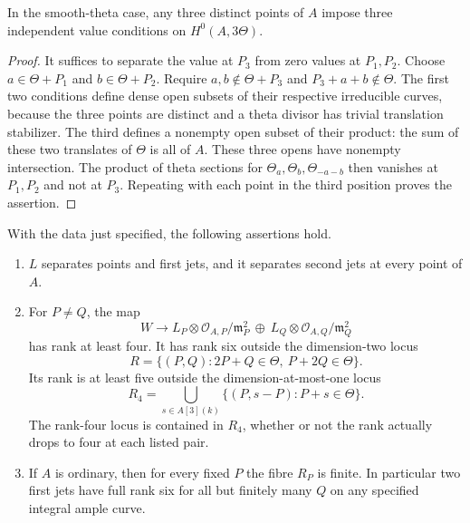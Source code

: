 \begin{lemma}\label{lem:ppav-three-distinct-values}
In the smooth-theta case, any three distinct points of $A$ impose three
independent value conditions on $H^0(A,3\Theta)$.
\end{lemma}
\begin{proof}
It suffices to separate the value at $P_3$ from zero values at
$P_1,P_2$. Choose $a\in\Theta+P_1$ and $b\in\Theta+P_2$.
Require $a,b\notin\Theta+P_3$ and $P_3+a+b\notin\Theta$.
The first two conditions define dense open subsets of their respective
irreducible curves, because the three points are distinct and a theta
divisor has trivial translation stabilizer. The third defines a
nonempty open subset of their product: the sum of these two translates
of $\Theta$ is all of $A$. These three opens have nonempty intersection.
The product of theta sections for $\Theta_a,\Theta_b,\Theta_{-a-b}$
then vanishes at $P_1,P_2$ and not at $P_3$. Repeating with each
point in the third position proves the assertion.
\end{proof}

\begin{theorem}\label{thm:ppav-three-theta-jets}
With the data just specified, the following assertions hold.
\begin{enumerate}
\item $L$ separates points and first jets, and it separates second jets
at every point of $A$.
\item For $P\ne Q$, the map
\[
 W\longrightarrow
 L_P\otimes\mathcal O_{A,P}/\mathfrak m_P^2\ \oplus\
 L_Q\otimes\mathcal O_{A,Q}/\mathfrak m_Q^2
\]
has rank at least four. It has rank six outside the dimension-two locus
\[
 R=\{(P,Q):2P+Q\in\Theta,\ P+2Q\in\Theta\}.
\]
Its rank is at least five outside the dimension-at-most-one locus
\[
 R_4=\bigcup_{s\in A[3](k)}
       \{(P,s-P):P+s\in\Theta\}.
\]
The rank-four locus is contained in $R_4$, whether or not the rank
actually drops to four at each listed pair.
\item If $A$ is ordinary, then for every fixed $P$ the fibre $R_P$
is finite. In particular two first jets have full rank six for all
but finitely many $Q$ on any specified integral ample curve.
\end{enumerate}
\end{theorem}

